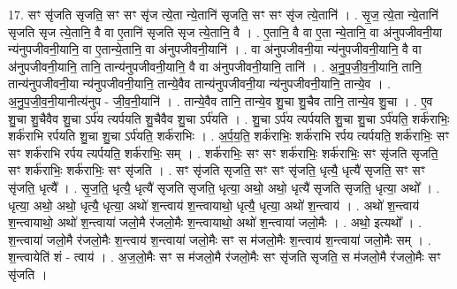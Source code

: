\documentclass[17pt]{extarticle}
\begin{document}
17. सꣳ सृ॑जति सृजति॒ सꣳ सꣳ सृ॑ज त्ये॒ता न्ये॒तानि॑ सृजति॒ सꣳ सꣳ सृ॑ज त्ये॒तानि॑ । . सृ॒ज॒ त्ये॒ता न्ये॒तानि॑ सृजति सृज त्ये॒तानि॒ वै वा ए॒तानि॑ सृजति सृज त्ये॒तानि॒ वै । . ए॒तानि॒ वै वा ए॒ता न्ये॒तानि॒ वा अ॑नुपजीवनी॒या न्य॑नुपजीवनी॒यानि॒ वा ए॒तान्ये॒तानि॒ वा अ॑नुपजीवनी॒यानि॑ । . वा अ॑नुपजीवनी॒या न्य॑नुपजीवनी॒यानि॒ वै वा अ॑नुपजीवनी॒यानि॒ तानि॒ तान्य॑नुपजीवनी॒यानि॒ वै वा अ॑नुपजीवनी॒यानि॒ तानि॑ । . अ॒नु॒प॒जी॒व॒नी॒यानि॒ तानि॒ तान्य॑नुपजीवनी॒या न्य॑नुपजीवनी॒यानि॒ तान्ये॒वैव तान्य॑नुपजीवनी॒या न्य॑नुपजीवनी॒यानि॒ तान्ये॒व । . अ॒नु॒प॒जी॒व॒नी॒यानीत्य॑नुप - जी॒व॒नी॒यानि॑ । . तान्ये॒वैव तानि॒ तान्ये॒व शु॒चा शु॒चैव तानि॒ तान्ये॒व शु॒चा । . ए॒व शु॒चा शु॒चैवैव शु॒चा ऽर्प॑य त्यर्पयति शु॒चैवैव शु॒चा ऽर्प॑यति । . शु॒चा ऽर्प॑य त्यर्पयति शु॒चा शु॒चा ऽर्प॑यति॒ शर्क॑राभिः॒ शर्क॑राभि रर्पयति शु॒चा शु॒चा ऽर्प॑यति॒ शर्क॑राभिः । . अ॒र्प॒य॒ति॒ शर्क॑राभिः॒ शर्क॑राभि रर्पय त्यर्पयति॒ शर्क॑राभिः॒ सꣳ सꣳ शर्क॑राभि रर्पय त्यर्पयति॒ शर्क॑राभिः॒ सम् । . शर्क॑राभिः॒ सꣳ सꣳ शर्क॑राभिः॒ शर्क॑राभिः॒ सꣳ सृ॑जति सृजति॒ सꣳ शर्क॑राभिः॒ शर्क॑राभिः॒ सꣳ सृ॑जति । . सꣳ सृ॑जति सृजति॒ सꣳ सꣳ सृ॑जति॒ धृत्यै॒ धृत्यै॑ सृजति॒ सꣳ सꣳ सृ॑जति॒ धृत्यै᳚ । . सृ॒ज॒ति॒ धृत्यै॒ धृत्यै॑ सृजति सृजति॒ धृत्या॒ अथो॒ अथो॒ धृत्यै॑ सृजति सृजति॒ धृत्या॒ अथो᳚ । . धृत्या॒ अथो॒ अथो॒ धृत्यै॒ धृत्या॒ अथो॑ श॒न्त्वाय॑ श॒न्त्वायाथो॒ धृत्यै॒ धृत्या॒ अथो॑ श॒न्त्वाय॑ । . अथो॑ श॒न्त्वाय॑ श॒न्त्वायाथो॒ अथो॑ श॒न्त्वाया॑ जलो॒मै र॑जलो॒मैः श॒न्त्वायाथो॒ अथो॑ श॒न्त्वाया॑ जलो॒मैः । . अथो॒ इत्यथो᳚ । . श॒न्त्वाया॑ जलो॒मै र॑जलो॒मैः श॒न्त्वाय॑ श॒न्त्वाया॑ जलो॒मैः सꣳ स म॑जलो॒मैः श॒न्त्वाय॑ श॒न्त्वाया॑ जलो॒मैः सम् । . श॒न्त्वायेति॑ शं - त्वाय॑ । . अ॒ज॒लो॒मैः सꣳ स म॑जलो॒मै र॑जलो॒मैः सꣳ सृ॑जति सृजति॒ स म॑जलो॒मै र॑जलो॒मैः सꣳ सृ॑जति । \newline
\end{document}
